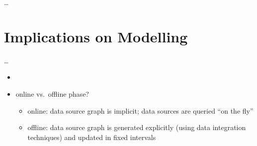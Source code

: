 \dots

\section{Implications on Modelling}
\label{sec:implications_on_modelling}

\dots

\begin{itemize}
  \item
  \item 
    online vs.\ offline phase?
    \begin{itemize}
      \item
        online: data source graph is implicit; data sources are queried \enquote{on the fly}
      \item
        offline: data source graph is generated explicitly (using data integration techniques)
        and updated in fixed intervals
    \end{itemize}
\end{itemize}



